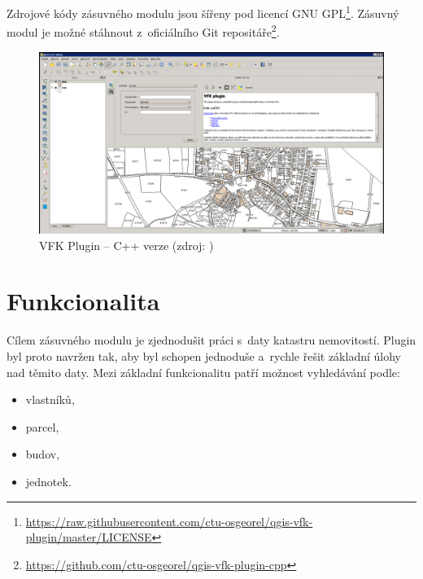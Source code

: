 \documentclass[a4paper,12pt,oneside]{book}
\begin{document}
Zdrojové kódy zásuvného modulu jsou šířeny pod licencí GNU
GPL\footnote{\url{https://raw.githubusercontent.com/ctu-osgeorel/qgis-vfk-plugin/master/LICENSE}}. Zásuvný
modul je možné stáhnout z~oficiálního Git
repositáře\footnote{\url{https://github.com/ctu-osgeorel/qgis-vfk-plugin-cpp}}.

\begin{figure}[htb]
\centering
\includegraphics[width=\textwidth]{images/vfkPlugin-puvodni_okno.png}
\caption[VFK Plugin -- C++ verze]{VFK Plugin -- C++ verze (zdroj: \cite{cvut_vfkPlugin})}
\end{figure}

\newpage
\section{Funkcionalita}
Cílem zásuvného modulu je zjednodušit práci s~daty katastru
nemovitostí. Plugin byl proto navržen tak, aby byl schopen jednoduše
a~rychle řešit základní úlohy nad těmito daty. Mezi základní
funkcionalitu patří možnost vyhledávání podle:

\begin{itemize}
 \item vlastníků,
 \item parcel,
 \item budov,
 \item jednotek.
\end{itemize}
\end{document}
